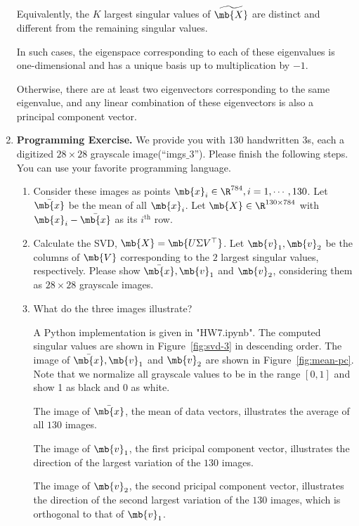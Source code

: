 \begin{exercise}
\begin{enumerate}
\begin{solution}
                Equivalently, the $K$ largest singular values of $\widetilde{\mb{X}}$ are distinct and different from the remaining singular values.

                In such cases, the eigenspace corresponding to each of these eigenvalues is one-dimensional and has a unique basis up to multiplication by $-1$.

                Otherwise, there are at least two eigenvectors corresponding to the same eigenvalue, and any linear combination of these eigenvectors is also a principal component vector.
                \qedhere
            \end{solution}

        \item {\bf Programming Exercise.} We provide you with $130$ handwritten $3$s, each a digitized $28 \times 28$ grayscale image(``imgs$\_3$''). Please finish the following steps. You can use your favorite programming language.
            \begin{enumerate}
                \item
                    Consider these images as points $\mb{x}_i\in\R^{784}, i=1,\cdots,130$.  Let $\bar{\mb{x}}$ be the mean of all $\mb{x}_i$. Let $\mb{X}\in\R^{130\times 784}$ with $\mb{x}_i-\bar{\mb{x}}$ as its $i^{\text{th}}$ row.

                \item
                    Calculate the SVD, $\mb{X}=\mb{U\Sigma V^\top}$. Let $\mb{v}_1, \mb{v}_2$ be the columns of $\mb{V}$ corresponding to the $2$ largest singular values, respectively. Please show $\bar{\mb{x}}, \mb{v}_1$ and $\mb{v}_2$, considering them as $28\times 28$ grayscale images.

                \item
                    What do the three images illustrate?

                    \begin{solution}
                        A Python implementation is given in "HW7.ipynb". The computed singular values are shown in Figure~\ref{fig:svd-3} in descending order. The image of $\bar{\mb{x}}, \mb{v}_1$ and $\mb{v}_2$ are shown in Figure~\ref{fig:mean-pc}. Note that we normalize all grayscale values to be in the range $[0,1]$ and show 1 as black and 0 as white.

                        The image of $\bar{\mb{x}}$, the mean of data vectors, illustrates the average of all $130$ images.

                        The image of $\mb{v}_1$, the first pricipal component vector, illustrates the direction of the largest variation of the $130$ images.

                        The image of $\mb{v}_2$, the second pricipal component vector, illustrates the direction of the second largest variation of the $130$ images, which is orthogonal to that of $\mb{v}_1$.
                        \qedhere
                    \end{solution}
            \end{enumerate}
    \end{enumerate}
\end{exercise}
